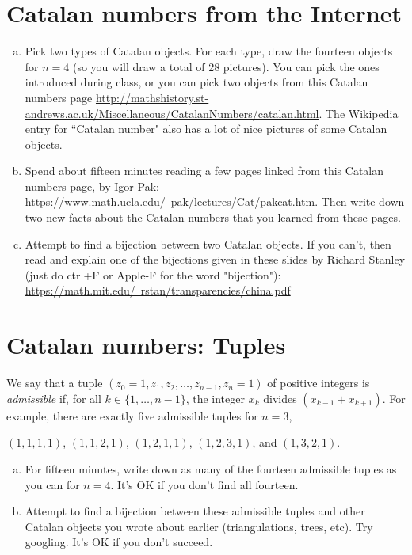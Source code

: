 \documentclass[10pt]{amsart}
\begin{document}
\section{Catalan numbers from the Internet}
\begin{enumerate}[a.]
	\item Pick two types of Catalan objects. For each type, draw the fourteen objects for $n=4$ (so you will draw a total of 28 pictures). 
	You can pick the ones introduced during class, or you can pick two objects from this Catalan numbers page \href{http://mathshistory.st-andrews.ac.uk/Miscellaneous/CatalanNumbers/catalan.html}{http://mathshistory.st-andrews.ac.uk/Miscellaneous/CatalanNumbers/catalan.html}. The Wikipedia entry for ``Catalan number" also has a lot of nice pictures of some Catalan objects. 	
	\item 
	Spend about fifteen minutes reading a few pages linked from this Catalan numbers page,  by Igor Pak:\\
	 \href{https://www.math.ucla.edu/~pak/lectures/Cat/pakcat.htm}{https://www.math.ucla.edu/~pak/lectures/Cat/pakcat.htm}. Then 
	write down two new facts about the Catalan numbers that you learned from these pages. 
	\item Attempt to find a bijection between two Catalan objects. If you can't, then read and explain one of the bijections given in these slides by Richard Stanley (just do ctrl+F or Apple-F for the word "bijection"):
\href{https://math.mit.edu/~rstan/transparencies/china.pdf}{https://math.mit.edu/~rstan/transparencies/china.pdf}

\end{enumerate}



\section{Catalan numbers: Tuples}
We say that a tuple $(z_0=1, z_1, z_2, \dots, z_{n-1}, z_n=1)$ of positive integers  is \emph{admissible} 
if, for all $k \in \{1, \dots, n-1\}$, the integer $x_k$ divides $(x_{k-1} + x_{k+1})$. 
For example, there are exactly five admissible tuples for $n=3$,
\begin{center}
$(1,1,1,1)$, $(1,1,2,1)$, $(1,2,1,1)$, $(1,2,3,1)$, and $(1,3,2,1)$.
\end{center}

\begin{enumerate}[a.]
\item 
For fifteen minutes, write down as many of the fourteen admissible tuples as you can for $n=4$. It's OK if you don't find all fourteen.
		
\item 
Attempt to find a bijection between these admissible tuples and other Catalan objects you wrote about earlier (triangulations, trees, etc). Try googling. It's OK if you don't succeed.

\end{enumerate}
\end{document}
